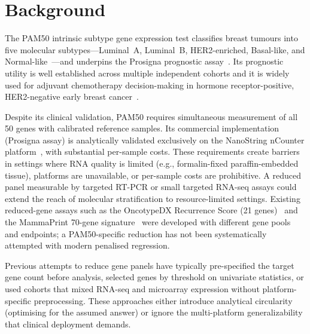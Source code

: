 \documentclass[referee,lineno,pdflatex,sn-vancouver-num]{sn-jnl}
\begin{document}

\maketitle

\section{Background}\label{sec:background}

The PAM50 intrinsic subtype gene expression test classifies breast tumours into five molecular subtypes---Luminal~A, Luminal~B, HER2-enriched, Basal-like, and Normal-like~\cite{perou2000,sorlie2001}---and underpins the Prosigna prognostic assay~\cite{parker2009}. Its prognostic utility is well established across multiple independent cohorts and it is widely used for adjuvant chemotherapy decision-making in hormone receptor-positive, HER2-negative early breast cancer~\cite{cardoso2016,sparano2018}.

Despite its clinical validation, PAM50 requires simultaneous measurement of all 50 genes with calibrated reference samples. Its commercial implementation (Prosigna assay) is analytically validated exclusively on the NanoString nCounter platform~\cite{nielsen2014}, with substantial per-sample costs. These requirements create barriers in settings where RNA quality is limited (e.g., formalin-fixed paraffin-embedded tissue), platforms are unavailable, or per-sample costs are prohibitive. A reduced panel measurable by targeted RT-PCR or small targeted RNA-seq assays could extend the reach of molecular stratification to resource-limited settings. Existing reduced-gene assays such as the OncotypeDX Recurrence Score (21 genes)~\cite{paik2004} and the MammaPrint 70-gene signature~\cite{vantveer2002} were developed with different gene pools and endpoints; a PAM50-specific reduction has not been systematically attempted with modern penalised regression.

Previous attempts to reduce gene panels have typically pre-specified the target gene count before analysis, selected genes by threshold on univariate statistics, or used cohorts that mixed RNA-seq and microarray expression without platform-specific preprocessing. These approaches either introduce analytical circularity (optimising for the assumed answer) or ignore the multi-platform generalizability that clinical deployment demands.
\end{document}
